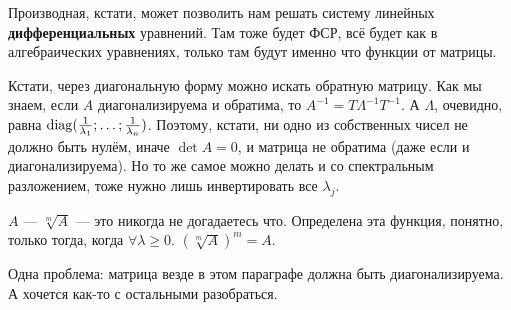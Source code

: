 \documentclass{article}
\begin{document}
\begin{itemize}
        \begin{Comment}
            Производная, кстати, может позволить нам решать систему линейных \textbf{дифференциальных} уравнений. Там тоже будет ФСР, всё будет как в алгебраических уравнениях, только там будут именно что функции от матрицы.
        \end{Comment}
        \begin{Comment}
            Кстати, через диагональную форму можно искать обратную матрицу. Как мы знаем, если $A$ диагонализируема и обратима, то $A^{-1}=T\Lambda^{-1}T^{-1}$. А $\Lambda$, очевидно, равна $\operatorname{diag}(\frac1{\lambda_1};\ldots;\frac1{\lambda_n})$. Поэтому, кстати, ни одно из собственных чисел не должно быть нулём, иначе $\det A=0$, и матрица не обратима (даже если и диагонализируема). Но то же самое можно делать и со спектральным разложением, тоже нужно лишь инвертировать все $\lambda_j$.
        \end{Comment}
        \dfn {} $A$ --- $\sqrt[m]A$ --- это никогда не догадаетесь что. Определена эта функция, понятно, только тогда, когда $\forall\lambda\geqslant0$.
        \thm $(\sqrt[m]A)^m=A$.
        \begin{Comment}
            Одна проблема: матрица везде в этом параграфе должна быть диагонализируема. А хочется как-то с остальными разобраться.
        \end{Comment}
    \end{itemize}
\end{document}
